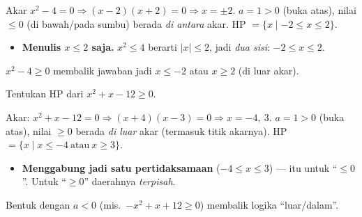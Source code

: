 \jawab
{} Akar $x^2-4=0\Rightarrow(x-2)(x+2)=0\Rightarrow x=\pm2$.
 $a=1>0$ (buka atas), nilai $\le0$ (di bawah/pada sumbu) berada
\emph{di antara} akar.
\jadi HP $=\{x\mid -2\le x\le2\}$.

\begin{center}
\end{center}

\begin{jebakan}
\begin{itemize}[leftmargin=*,topsep=2pt]
  \item \textbf{Menulis $x\le2$ saja.} $x^2\le4$ berarti $|x|\le2$, jadi
  \emph{dua sisi}: $-2\le x\le2$.
\end{itemize}
\end{jebakan}

\begin{variasi}
$x^2-4\ge0$ membalik jawaban jadi $x\le-2$ atau $x\ge2$ (di luar akar).
\end{variasi}

\begin{soalbox}{}
Tentukan HP dari $x^2+x-12\ge0$.
\end{soalbox}

\jawab
{} Akar: $x^2+x-12=0\Rightarrow(x+4)(x-3)=0\Rightarrow x=-4,\ 3$.
 $a=1>0$ (buka atas), nilai $\ge0$ berada \emph{di luar} akar
(termasuk titik akarnya).
\jadi HP $=\{x\mid x\le-4\ \text{atau}\ x\ge3\}$.

\begin{jebakan}
\begin{itemize}[leftmargin=*,topsep=2pt]
  \item \textbf{Menggabung jadi satu pertidaksamaan} ($-4\le x\le3$) --- itu
  untuk ``$\le0$''. Untuk ``$\ge0$'' daerahnya \emph{terpisah}.
\end{itemize}
\end{jebakan}

\begin{variasi}
Bentuk dengan $a<0$ (mis.\ $-x^2+x+12\ge0$) membalik logika ``luar/dalam''.
\end{variasi}

